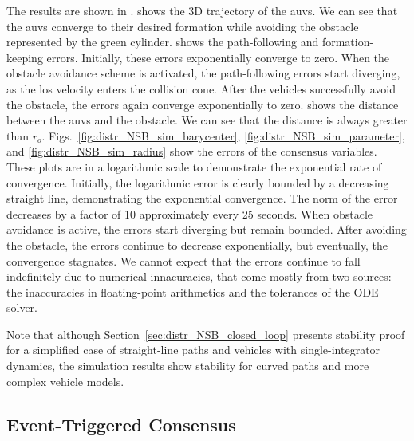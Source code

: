 The results are shown in .
 shows the 3D trajectory of the \glspl{auv}. We can see that the \glspl{auv} converge to their desired formation while avoiding the obstacle represented by the green cylinder.
 shows the path-following and formation-keeping errors. Initially, these errors exponentially converge to zero. When the obstacle avoidance scheme is activated, the path-following errors start diverging, as the \gls{los} velocity enters the collision cone. After the vehicles successfully avoid the obstacle, the errors again converge exponentially to zero.
 shows the distance between the \glspl{auv} and the obstacle. We can see that the distance is always greater than $r_o$.
Figs.~\ref{fig:distr_NSB_sim_barycenter}, \ref{fig:distr_NSB_sim_parameter}, and \ref{fig:distr_NSB_sim_radius} show the errors of the consensus variables. These plots are in a logarithmic scale to demonstrate the exponential rate of convergence. Initially, the logarithmic error is clearly bounded by a decreasing straight line, demonstrating the exponential convergence. The norm of the error decreases by a factor of 10 approximately every 25 seconds. When obstacle avoidance is active, the errors start diverging but remain bounded. After avoiding the obstacle, the errors continue to decrease exponentially, but eventually, the convergence stagnates. We cannot expect that the errors continue to fall indefinitely due to numerical innacuracies, that come mostly from two sources: the inaccuracies in floating-point arithmetics and the tolerances of the ODE solver.

Note that although Section~\ref{sec:distr_NSB_closed_loop} presents stability proof for a simplified case of straight-line paths and vehicles with single-integrator dynamics, the simulation results show stability for curved paths and more complex vehicle models.



\subsection{Event-Triggered Consensus}

